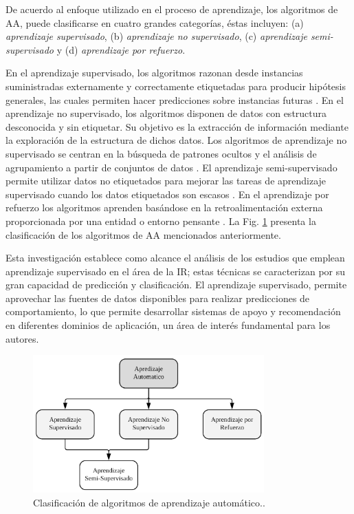 \documentclass[journal]{IEEEtran}
\begin{document}
De acuerdo al enfoque utilizado en el proceso de aprendizaje, los algoritmos de AA, puede clasificarse en cuatro grandes categorías, éstas incluyen: (a) \textit{aprendizaje supervisado}, (b) \textit{aprendizaje no supervisado}, (c) \textit{aprendizaje semi-supervisado} y (d) \textit{aprendizaje por refuerzo}. 

En el aprendizaje supervisado, los algoritmos razonan desde instancias suministradas externamente y correctamente etiquetadas para producir hipótesis generales, las cuales permiten hacer predicciones sobre instancias futuras \cite{kotsiantis2007supervised}. En el aprendizaje no supervisado, los algoritmos disponen de datos con estructura desconocida y sin etiquetar. Su objetivo es la extracción de información mediante la exploración de la estructura de dichos datos. Los algoritmos de aprendizaje no supervisado se centran en la búsqueda de patrones ocultos y el análisis de agrupamiento a partir de conjuntos de datos \cite{celebi2016unsupervised}. El aprendizaje semi-supervisado permite utilizar datos no etiquetados para mejorar las tareas de aprendizaje supervisado cuando los datos etiquetados son escasos \cite{Knox2018}. En el aprendizaje por refuerzo los algoritmos aprenden basándose en la retroalimentación externa proporcionada por una entidad o entorno pensante \cite{sutton1998reinforcement}. La Fig. \ref{fig:1} presenta la clasificación de los algoritmos de AA mencionados anteriormente.

Esta investigación establece como alcance el análisis de los estudios que emplean aprendizaje supervisado en el área de la IR; estas técnicas se caracterizan por su gran capacidad de predicción y clasificación. El aprendizaje supervisado, permite aprovechar las fuentes de datos disponibles para realizar predicciones de comportamiento, lo que permite desarrollar sistemas de apoyo y recomendación en diferentes dominios de aplicación, un área de interés fundamental para los autores.

\begin{figure}[!t]
\centering
\includegraphics[width=3.5in]{figures/figure1_Guada.png}
\caption{Clasificación de algoritmos de aprendizaje automático..}
\label{fig:1}
\end{figure}
\end{document}
